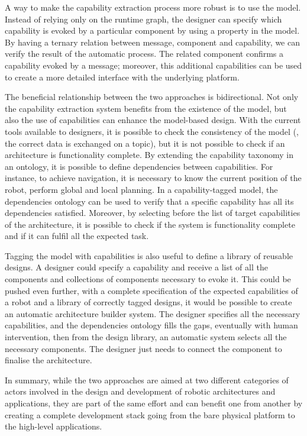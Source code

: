 A way to make the capability extraction process more robust is to use the model. Instead of relying only on the runtime graph, the designer can specify which capability is evoked by a particular component by using a property in the model. By having a ternary relation between message, component and capability, we can verify the result of the automatic process. The related component confirms a capability evoked by a message; moreover, this additional capabilities can be used to create a more detailed interface with the underlying platform.

The beneficial relationship between the two approaches is bidirectional. Not only the capability extraction system benefits from the existence of the model, but also the use of capabilities can enhance the model-based design. With the current tools available to designers, it is possible to check the consistency of the model (\eg, the correct data is exchanged on a topic), but it is not possible to check if an architecture is functionality complete. By extending the capability taxonomy in an ontology, it is possible to define dependencies between capabilities. For instance, to achieve navigation, it is necessary to know the current position of the robot, perform global and local planning. In a capability-tagged model, the dependencies ontology can be used to verify that a specific capability has all its dependencies satisfied. Moreover, by selecting before the list of target capabilities of the architecture, it is possible to check if the system is functionality complete and if it can fulfil all the expected task.

Tagging the model with capabilities is also useful to define a library of reusable designs. A designer could specify a capability and receive a list of all the components and collections of components necessary to evoke it. This could be pushed even further, with a complete specification of the expected capabilities of a robot and a library of correctly tagged designs, it would be possible to create an automatic architecture builder system. The designer specifies all the necessary capabilities, and the dependencies ontology fills the gaps, eventually with human intervention, then from the design library, an automatic system selects all the necessary components. The designer just needs to connect the component to finalise the architecture.

In summary, while the two approaches are aimed at two different categories of actors involved in the design and development of robotic architectures and applications, they are part of the same effort and can benefit one from another by creating a complete development stack going from the bare physical platform to the high-level applications. 

